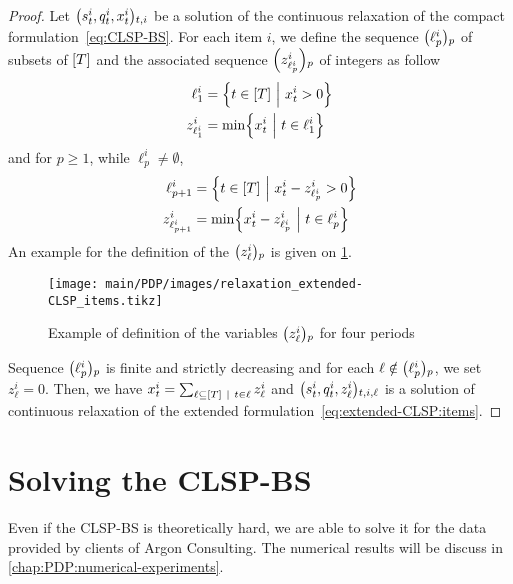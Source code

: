 \begin{proof}
Let $\bracket{\inventory_t^i, \quantity_t^i, \setup_t^i}_{t,i}$ be a solution of the continuous relaxation of the compact formulation~\eqref{eq:CLSP-BS}.
For each item $i$, we define the sequence $\bracket{\ell_p^i}_p$ of subsets of $\range{\horizon}$ and the associated sequence $\bracket{z_{\ell_p^i}^i}_p$ of integers as follow
\begin{equation}
  \begin{aligned}
  \ell_1^i       &= \crbracket{t\in\range{\horizon}~\Big|~\setup_t^i>0} \\
  z_{\ell_1^i}^i &= \min\crbracket{\setup_t^i~\Big|~t\in\ell_1^i}
  \end{aligned}
\end{equation}
and for $p\ge1$, while $\ell_p^i\ne\emptyset$,
\begin{equation}
  \begin{aligned}
  \ell_{p+1}^i       &= \crbracket{t\in\range{\horizon}~\Big|~\setup_t^i-z_{\ell_p^i}^i>0} \\
  z_{\ell_{p+1}^i}^i &= \min\crbracket{\setup_t^i-z_{\ell_p^i}^i~\Big|~t\in\ell_p^i}
  \end{aligned}
\end{equation}
An example for the definition of the $\bracket{z_{\ell}^i}_p$ is given on \cref{fig:relaxation-extended-formulation-by-reference}.

\begin{figure}[h]
  \centering
  \texttt{[image: main/PDP/images/relaxation\_extended-CLSP\_items.tikz]}
  \caption{Example of definition of the variables $\bracket{z_{\ell}^i}_p$ for four periods}
  \label{fig:relaxation-extended-formulation-by-reference}
\end{figure}

Sequence $\bracket{\ell_p^i}_p$ is finite and strictly decreasing and for each $\ell\notin\bracket{\ell_p^i}_p$, we set $z_{\ell}^i=0$.
Then, we have $\setup_t^i = \sum_{\ell\subseteq\range{\horizon}~|~t\in\ell} z_{\ell}^i$ and $\bracket{\inventory_t^i, \quantity_t^i, z_{\ell}^i}_{t,i,\ell}$ is a solution of continuous relaxation of the extended formulation~\eqref{eq:extended-CLSP:items}.
\end{proof}




\section{Solving the CLSP-BS}
\label{sec:PDP:deterministic:solving}

Even if the CLSP-BS is theoretically hard, we are able to solve it for the data provided by clients of Argon Consulting.
The numerical results will be discuss in \cref{chap:PDP:numerical-experiments}.


